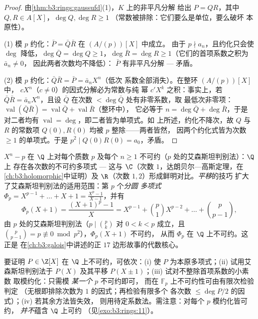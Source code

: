 \begin{proof}
由\cref{thm:b3:rings:gaussufd}(1)，$K$ 上的非平凡分解
给出 $P = QR$，其中 $Q, R \in A[X]$，$\deg Q, \deg R \geq 1$
（常数被排除：它们要么是单位，要么破坏
本原性）。

(1) 模 $p$ 约化：$\bar P = \bar Q\bar R$ 在 $(A/(p))[X]$ 中成立。
由于 $p \nmid a_n$，且约化只会使 $\deg$ 降低，$\deg \bar
Q = \deg Q \geq 1$，$\deg\bar R = \deg R \geq 1$（它们的首项系数之积为 $\bar a_n \neq 0$，
因此两者次数均不降低）：
$\bar P$ 有非平凡分解 --- 矛盾。

(2) 模 $p$ 约化：$\bar Q \bar R = \bar P = \bar a_n X^n$（低次
系数全部消失）。在整环 $(A/(p))[X]$ 中，
$cX^n$（$c \ne 0$）的因式分解必为常数与纯
幂 $c'X^k$ 之积：事实上，若 $\bar Q\bar R = \bar a_nX^n$，且设
$\bar Q$ 在次数 $< \deg\bar Q$ 处有非零系数，取
最低次非零项：$\operatorname{val}(\bar Q\bar R) =
\operatorname{val}\bar Q + \operatorname{val}\bar R$（整环中），
它必等于 $n = \deg\bar Q + \deg\bar R$，于是
对二者均有 $\operatorname{val} = \deg$，即二者皆为单项式。如
上所述，约化不降次，故 $Q$ 与 $R$ 的常数项
$Q(0), R(0)$ 均被 $p$ 整除——两者皆然，
因两个约化式皆为次数 $\geq 1$ 的单项式。于是 $p^2 \mid
Q(0)R(0) = a_0$，矛盾。
\end{proof}

\begin{example}\label{ex:b3:rings:eisenstein}
$X^n - p$ 在 $\Q$ 上对每个质数 $p$ 及每个 $n
\geq 1$ 不可约（$p$ 处的艾森斯坦判别法）：$\Q$ 上
存在各次数的不可约多项式 --- 这与 $\C$（次数
$1$，达朗贝尔—高斯定理，在\cref{ch:b3:holomorphic}中证明）及
$\R$（次数 $1, 2$）形成鲜明对比。\emph{平移}的技巧
扩大了艾森斯坦判别法的适用范围：第 $p$ 个\emph{分圆
多项式} $\Phi_p = X^{p-1} +
\dots + X + 1 = \frac{X^p - 1}{X - 1}$，并有
\[
\Phi_p(X + 1) = \frac{(X+1)^p - 1}{X}
= X^{p-1} + \binom{p}{1}X^{p-2} + \dots + \binom{p}{p-1},
\]
由 $p$ 处的艾森斯坦判别法（$p \mid \binom pk$ 对 $0 < k < p$ 成立，且
$\binom{p}{p-1} = p \not\equiv 0 \bmod p^2$），$\Phi_p(X+1)$ 不可约，
从而 $\Phi_p$ 在 $\Q$ 上不可约。这正是
在\cref{ch:b3:galois}中讲述的正 $17$ 边形故事的代数核心。
\end{example}

\begin{method}\label{met:b3:rings:irreducibility}
要证明 $P \in \Z[X]$ 在 $\Q$ 上不可约，可依次：(i) 使 $P$
为本原多项式；(ii) 试用艾森斯坦判别法于 $P(X)$ 及其平移 $P(X \pm
1)$；(iii) 试对不整除首项系数的小素数
取模约化：只需模 \emph{某一个} $p$ 不可约即可，
而在 $\mathbb F_p$ 上不可约性可由有限次检验判定
（无根即排除次数为 $1$ 的因式；再检验有限多个
各次数 $\leq \deg P/2$ 的因式）；(iv) 若其余方法皆失效，
则用待定系数法。需注意：对每个 $p$ 模约化皆可约，
\emph{并不}蕴含 $\Q$ 上可约
（见\cref{exo:b3:rings:11}）。
\end{method}

